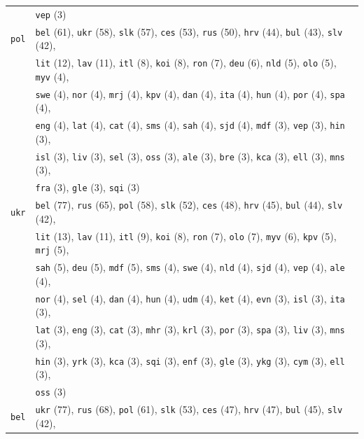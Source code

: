 \begin{center}
\begin{longtable}{ll}
 & \texttt{vep} (3) \\
\texttt{pol} & \texttt{bel} (61), \texttt{ukr} (58), \texttt{slk} (57), \texttt{ces} (53), \texttt{rus} (50), \texttt{hrv} (44), \texttt{bul} (43), \texttt{slv} (42),\\
 & \texttt{lit} (12), \texttt{lav} (11), \texttt{itl} (8), \texttt{koi} (8), \texttt{ron} (7), \texttt{deu} (6), \texttt{nld} (5), \texttt{olo} (5), \texttt{myv} (4),\\
 & \texttt{swe} (4), \texttt{nor} (4), \texttt{mrj} (4), \texttt{kpv} (4), \texttt{dan} (4), \texttt{ita} (4), \texttt{hun} (4), \texttt{por} (4), \texttt{spa} (4),\\
 & \texttt{eng} (4), \texttt{lat} (4), \texttt{cat} (4), \texttt{sms} (4), \texttt{sah} (4), \texttt{sjd} (4), \texttt{mdf} (3), \texttt{vep} (3), \texttt{hin} (3),\\
 & \texttt{isl} (3), \texttt{liv} (3), \texttt{sel} (3), \texttt{oss} (3), \texttt{ale} (3), \texttt{bre} (3), \texttt{kca} (3), \texttt{ell} (3), \texttt{mns} (3),\\
 & \texttt{fra} (3), \texttt{gle} (3), \texttt{sqi} (3) \\
\texttt{ukr} & \texttt{bel} (77), \texttt{rus} (65), \texttt{pol} (58), \texttt{slk} (52), \texttt{ces} (48), \texttt{hrv} (45), \texttt{bul} (44), \texttt{slv} (42),\\
 & \texttt{lit} (13), \texttt{lav} (11), \texttt{itl} (9), \texttt{koi} (8), \texttt{ron} (7), \texttt{olo} (7), \texttt{myv} (6), \texttt{kpv} (5), \texttt{mrj} (5),\\
 & \texttt{sah} (5), \texttt{deu} (5), \texttt{mdf} (5), \texttt{sms} (4), \texttt{swe} (4), \texttt{nld} (4), \texttt{sjd} (4), \texttt{vep} (4), \texttt{ale} (4),\\
 & \texttt{nor} (4), \texttt{sel} (4), \texttt{dan} (4), \texttt{hun} (4), \texttt{udm} (4), \texttt{ket} (4), \texttt{evn} (3), \texttt{isl} (3), \texttt{ita} (3),\\
 & \texttt{lat} (3), \texttt{eng} (3), \texttt{cat} (3), \texttt{mhr} (3), \texttt{krl} (3), \texttt{por} (3), \texttt{spa} (3), \texttt{liv} (3), \texttt{mns} (3),\\
 & \texttt{hin} (3), \texttt{yrk} (3), \texttt{kca} (3), \texttt{sqi} (3), \texttt{enf} (3), \texttt{gle} (3), \texttt{ykg} (3), \texttt{cym} (3), \texttt{ell} (3),\\
 & \texttt{oss} (3) \\
\texttt{bel} & \texttt{ukr} (77), \texttt{rus} (68), \texttt{pol} (61), \texttt{slk} (53), \texttt{ces} (47), \texttt{hrv} (47), \texttt{bul} (45), \texttt{slv} (42),\\

\end{longtable}
\end{center}
